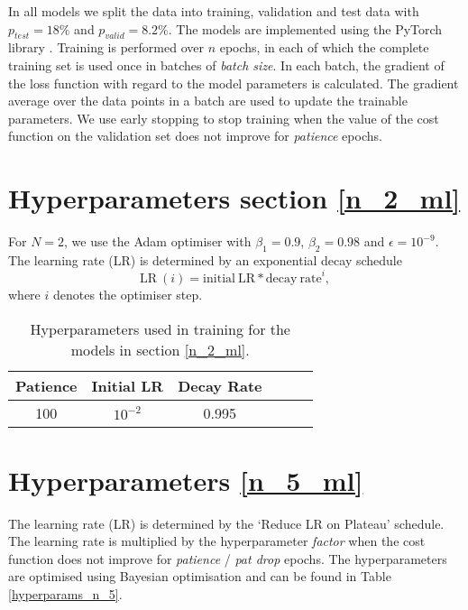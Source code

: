 In all models we split the data into training, validation and test data with $p_{test} = 18 \%$ and $p_{valid} = 8.2 \%$. 
The models are implemented using the PyTorch library \cite{NEURIPS2019_9015}. 
Training is performed over $n$ epochs, in each of which the complete training set is used once in batches of \textit{batch size}.
In each batch, the gradient of the loss function with regard to the model parameters is calculated.
The gradient average over the data points in a batch are used to update the trainable parameters.
We use early stopping to stop training when the value of the cost function on the validation set does not improve for \textit{patience} epochs.

\section{Hyperparameters section \ref{n_2_ml}}
For $N=2$, we use the Adam optimiser with $\beta_1 = 0.9$, $\beta_2 = 0.98$ and $\epsilon = 10^{-9}$. The learning rate (LR) is determined by an exponential decay schedule
\begin{equation} \label{eds}
\mathrm{LR} \ (i) = \mathrm{initial \ LR} * \mathrm{decay \ rate}^i,
\end{equation}
where $i$ denotes the optimiser step.


\begin{table}[h]
	\centering
	\begin{tabular}{c | c | c | c | c | c}
		Patience & Initial LR & Decay Rate \\
		\hline
		100 & $10^{-2}$ & 0.995 \\
	\end{tabular}
	\caption{Hyperparameters used in training for the models in section \ref{n_2_ml}.}
	\label{hyperparams_n_2}
\end{table}

\section{Hyperparameters \ref{n_5_ml}}
The learning rate (LR) is determined by the `Reduce LR on Plateau' schedule.
The learning rate is multiplied by the hyperparameter \textit{factor} when the cost function does not improve for \textit{patience} / \textit{pat drop} epochs.
The hyperparameters are optimised using Bayesian optimisation and can be found in Table \ref{hyperparams_n_5}.

